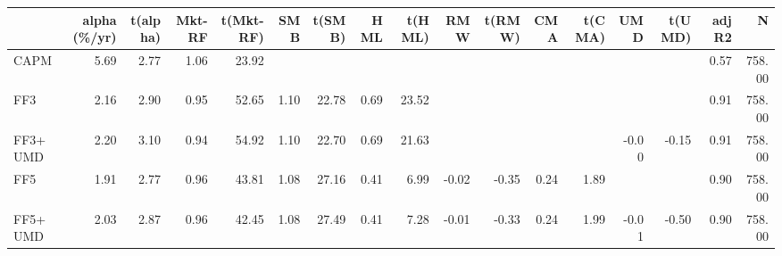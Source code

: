 \begin{tabular}{lrrrrrrrrrrrrrrrr}
\toprule
 & alpha (\%/yr) & t(alpha) & Mkt-RF & t(Mkt-RF) & SMB & t(SMB) & HML & t(HML) & RMW & t(RMW) & CMA & t(CMA) & UMD & t(UMD) & adj R2 & N \\
\midrule
CAPM & 5.69 & 2.77 & 1.06 & 23.92 &  &  &  &  &  &  &  &  &  &  & 0.57 & 758.00 \\
FF3 & 2.16 & 2.90 & 0.95 & 52.65 & 1.10 & 22.78 & 0.69 & 23.52 &  &  &  &  &  &  & 0.91 & 758.00 \\
FF3+UMD & 2.20 & 3.10 & 0.94 & 54.92 & 1.10 & 22.70 & 0.69 & 21.63 &  &  &  &  & -0.00 & -0.15 & 0.91 & 758.00 \\
FF5 & 1.91 & 2.77 & 0.96 & 43.81 & 1.08 & 27.16 & 0.41 & 6.99 & -0.02 & -0.35 & 0.24 & 1.89 &  &  & 0.90 & 758.00 \\
FF5+UMD & 2.03 & 2.87 & 0.96 & 42.45 & 1.08 & 27.49 & 0.41 & 7.28 & -0.01 & -0.33 & 0.24 & 1.99 & -0.01 & -0.50 & 0.90 & 758.00 \\
\bottomrule
\end{tabular}
